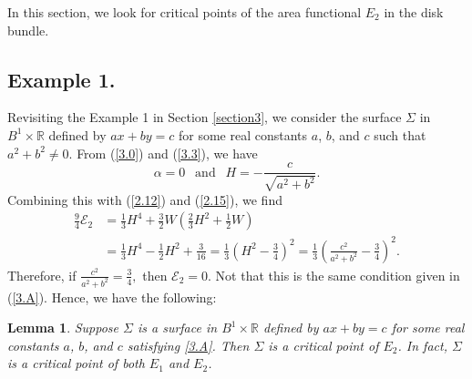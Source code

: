 \documentclass{amsart}
\newtheorem{lem}[theorem]{Lemma}
\theoremstyle{Corollary}
\numberwithin{equation}{section}
\begin{document}
In this section, we look for critical points of 
the area functional $E_2$ in the disk bundle. 

\subsection{Example 1.}
Revisiting the Example 1 in Section \ref{section3}, we 
consider the surface $\Sigma$ in $B^1\times\mathbb{R}$ 
defined by $ax+by=c$ for some real constants $a$, $b$, and $c$
such that $a^2+b^2\neq 0$. 
From  (\ref{3.0}) and (\ref{3.3}), we have
\begin{equation}\label{4.1}
\alpha=0~~\mbox{ and }~~H=-\frac{c}{\sqrt{a^2+b^2}}.
\end{equation}
Combining this with (\ref{2.12}) and (\ref{2.15}), 
we find 
\begin{equation*}
\begin{split}
\frac{9}{4}\mathcal{E}_2
&=\frac{1}{3}H^4+\frac{3}{2}W\left(\frac{2}{3}H^2+\frac{1}{2}W\right)\\
&=\frac{1}{3}H^4-\frac{1}{2}H^2+\frac{3}{16}
=\frac{1}{3}\left(H^2-\frac{3}{4}\right)^2
=\frac{1}{3}\left(\frac{c^2}{a^2+b^2}-\frac{3}{4}\right)^2.
\end{split}
\end{equation*}
Therefore, if 
$\displaystyle\frac{c^2}{a^2+b^2}=\frac{3}{4},$
then $\mathcal{E}_2=0$. 
Not that this is the same condition given in (\ref{3.A}). 
Hence, we have the following: 

\begin{lem}\label{lem4.1}
Suppose $\Sigma$ is a surface in $B^1\times\mathbb{R}$ 
defined by $ax+by=c$ for some real constants $a$, $b$, and $c$
satisfying \eqref{3.A}. 
Then $\Sigma$ is a critical point of $E_2$. 
In fact, $\Sigma$ is a critical point of both $E_1$ and $E_2$. 
\end{lem}
\end{document}
